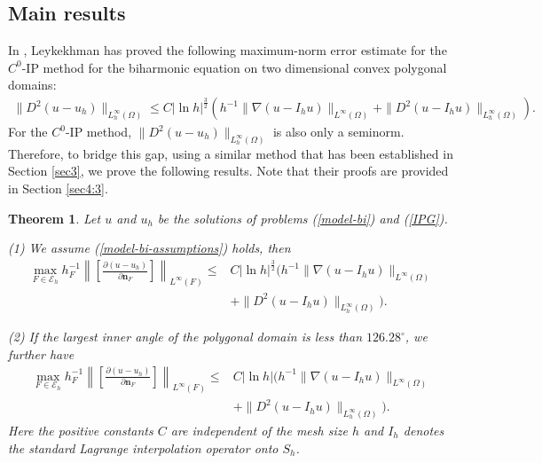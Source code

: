 \documentclass[1996/10/24]{amsart}
\newtheorem{theorem}{Theorem}[section]
\theoremstyle{definition}
\numberwithin{equation}{section}
\begin{document}
\subsection{Main results}\label{sec4:2}
In \cite{l2021}, Leykekhman has proved the following maximum-norm error estimate for the $C^0$-IP method for the
biharmonic equation on two dimensional convex polygonal domains:
\begin{align}
\|D^2(u-u_h)\|_{L^{\infty}_h(\Omega)}\leq C|\ln h|^{\frac{3}{2}}\left(h^{-1}\|\nabla(u-I_hu)\|_{L^{\infty}(\Omega)}+\|D^2(u-I_hu)\|_{L_h^{\infty}(\Omega)}\right).
\end{align}
For the $C^0$-IP method, $\|D^2(u-u_h)\|_{L^{\infty}_h(\Omega)}$ is also only a seminorm. Therefore, to bridge this gap, using a similar method that has been established in Section \ref{sec3}, we prove the following results. Note that their proofs are provided in Section \ref{sec4:3}.
\begin{theorem}\label{mn-bi-jump}
Let $u$ and $u_h$ be the solutions of problems (\ref{model-bi}) and (\ref{IPG}).

(1) We assume (\ref{model-bi-assumptions}) holds, then
\begin{align}
\max_{F\in\mathcal{E}_h}h^{-1}_F\left\|\left[\frac{\partial(u-u_h)}{\partial {\bm n}_F}\right]\right\|_{L^{\infty}(F)}\leq& C|\ln h|^{\frac{3}{2}}\Big(h^{-1}\|\nabla(u-I_hu)\|_{L^{\infty}(\Omega)}\\
&+\|D^2(u-I_hu)\|_{L_h^{\infty}(\Omega)}\Big).\nonumber
\end{align}

(2) If the largest inner angle of the polygonal domain is less than $126.28^\circ$, we further have
\begin{align}
\max_{F\in\mathcal{E}_h}h^{-1}_F\left\|\left[\frac{\partial(u-u_h)}{\partial {\bm n}_F}\right]\right\|_{L^{\infty}(F)}\leq& C|\ln h|\Big(h^{-1}\|\nabla(u-I_hu)\|_{L^{\infty}(\Omega)}\\
&+\|D^2(u-I_hu)\|_{L_h^{\infty}(\Omega)}\Big).\nonumber
\end{align}
Here the positive constants $C$ are independent of the mesh size $h$ and $I_h$ denotes the standard Lagrange interpolation
operator onto $S_h$.
\end{theorem}
\end{document}
